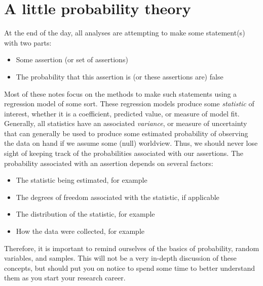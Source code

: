 

\chapter{A little probability theory}
\label{sec:prob}

At the end of the day, all analyses are attempting to make some statement(s) with two parts:
\begin{itemize}
\item{Some assertion (or set of assertions)}
\item{The probability that this assertion is (or these assertions are) false}
\end{itemize}
Most of these notes focus on the methods to make such statements using a regression model of some sort. These regression models produce some {\it statistic} of interest, whether it is a coefficient, predicted value, or measure of model fit. Generally, all statistics have an associated {\it variance}, or measure of uncertainty that can generally be used to produce some estimated probability of observing the data on hand if we assume some (null) worldview.  Thus, we should never lose sight of keeping track of the probabilities associated with our assertions. The probability associated with an assertion depends on several factors:
\begin{itemize}
\item{The statistic being estimated, for example}
\item{The degrees of freedom associated with the statistic, if applicable}
\item{The distribution of the statistic, for example}
\item{How the data were collected, for example}
\end{itemize}

Therefore, it is important to remind ourselves of the basics of probability, random variables, and samples. This will not be a very in-depth discussion of these concepts, but should put you on notice to spend some time to better understand them as you start your research career.

